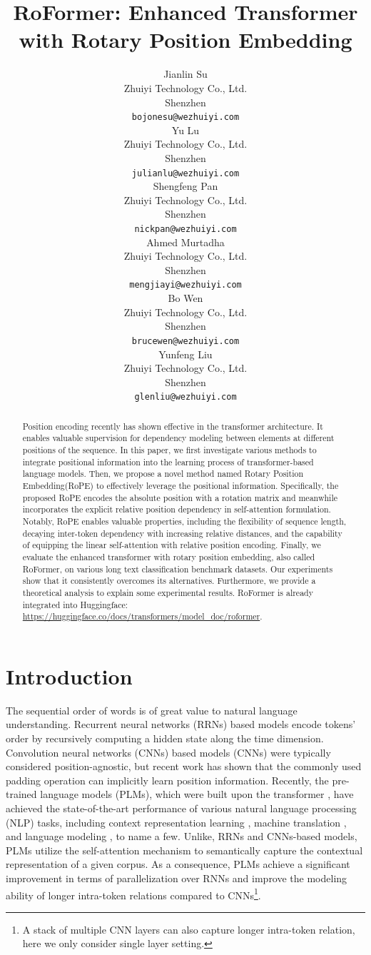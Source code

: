 \documentclass{article}
\title{RoFormer: Enhanced Transformer with Rotary Position Embedding}
\author{
	Jianlin Su \\
	Zhuiyi Technology Co., Ltd.\\
	Shenzhen \\
	\texttt{bojonesu@wezhuiyi.com} \\
	\And
	Yu Lu \\
	Zhuiyi Technology Co., Ltd.\\
	Shenzhen \\
	\texttt{julianlu@wezhuiyi.com} \\
	\And
	Shengfeng Pan \\
	Zhuiyi Technology Co., Ltd.\\
	Shenzhen \\
	\texttt{nickpan@wezhuiyi.com} \\
	\And
	Ahmed Murtadha \\
	Zhuiyi Technology Co., Ltd.\\
	Shenzhen \\
	\texttt{mengjiayi@wezhuiyi.com} \\
	\And
	Bo Wen \\
	Zhuiyi Technology Co., Ltd.\\
	Shenzhen \\
	\texttt{brucewen@wezhuiyi.com} \\
	\And
	Yunfeng Liu \\
	Zhuiyi Technology Co., Ltd.\\
	Shenzhen \\
	\texttt{glenliu@wezhuiyi.com} \\
}
\begin{document}
\maketitle

\begin{abstract}
	Position encoding recently has shown effective in the transformer architecture. It enables valuable supervision for dependency modeling between elements at different positions of the sequence. In this paper, we first investigate various methods to integrate positional information into the learning process of transformer-based language models. Then, we propose a novel method named Rotary Position Embedding(RoPE) to effectively leverage the positional information. Specifically, the proposed RoPE encodes the absolute position with a rotation matrix and meanwhile incorporates the explicit relative position dependency in self-attention formulation. Notably, RoPE enables valuable properties, including the flexibility of sequence length, decaying inter-token dependency with increasing relative distances, and the capability of equipping the linear self-attention with relative position encoding.
	Finally, we evaluate the enhanced transformer with rotary position embedding, also called RoFormer, on various long text classification benchmark datasets. Our experiments show that it consistently overcomes its alternatives. Furthermore, we provide a theoretical analysis to explain some experimental results. RoFormer is already integrated into Huggingface: \url{https://huggingface.co/docs/transformers/model_doc/roformer}.
\end{abstract}

\section{Introduction}
The sequential order of words is of great value to natural language understanding. Recurrent neural networks (RRNs) based models encode tokens' order by recursively computing a hidden state along the time dimension.  Convolution neural networks (CNNs) based models (CNNs) \cite{Gehring:2017} were typically considered position-agnostic, but recent work \cite{Islam2020HowMP} has shown that the commonly used padding operation can implicitly learn position information. 
Recently,  the pre-trained language models (PLMs), which were built upon the transformer \cite{Vaswani:2017}, have achieved the state-of-the-art performance of various natural language processing (NLP) tasks, including context representation learning \cite{Devlin2019BERTPO}, machine translation \cite{Vaswani:2017}, and language modeling \cite{Radford2019LanguageMA}, to name a few.  Unlike, RRNs and CNNs-based models, PLMs utilize the self-attention mechanism to semantically capture the contextual representation of a given corpus. As a consequence, PLMs achieve a significant improvement in terms of parallelization over RNNs and improve the modeling ability of longer intra-token relations compared to CNNs\footnote{A stack of multiple CNN layers can also capture longer intra-token relation, here we only consider single layer setting.}. 
\end{document}
